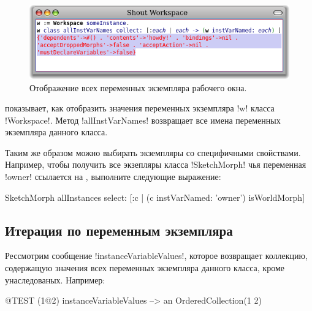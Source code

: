 \documentclass[a4paper,10pt,twoside]{book}
\begin{document}
\begin{figure}[ht]\centering
	\includegraphics[width=\linewidth]{allInstanceVariables}
	\caption{Отображение всех переменных экземпляра рабочего окна.\figlabel{allInstanceVariables}}
\end{figure}

 показывает, как отобразить значения переменных экземпляра \ct!w! класса \ct!Workspace!.
Метод \ct!allInstVarNames! возвращает все имена переменных экземпляра данного класса.

Таким же образом можно выбирать экземпляры со специфичными свойствами.
Например, чтобы получить все экзепляры класса \ct!SketchMorph! чья переменная \ct!owner! ссылается на , выполните следующие выражение:
\begin{code}{}
SketchMorph allInstances select: [:c | (c instVarNamed: 'owner') isWorldMorph]
\end{code}

\subsection{Итерация по переменным экземпляра}

Рессмотрим сообщение \ct!instanceVariableValues!, которое возвращает коллекцию, содержащую значения всех переменных экземпляра данного класса, кроме унаследованых.
Например:
\begin{code}{@TEST}
(1@2) instanceVariableValues --> an OrderedCollection(1 2)
\end{code}
\end{document}
